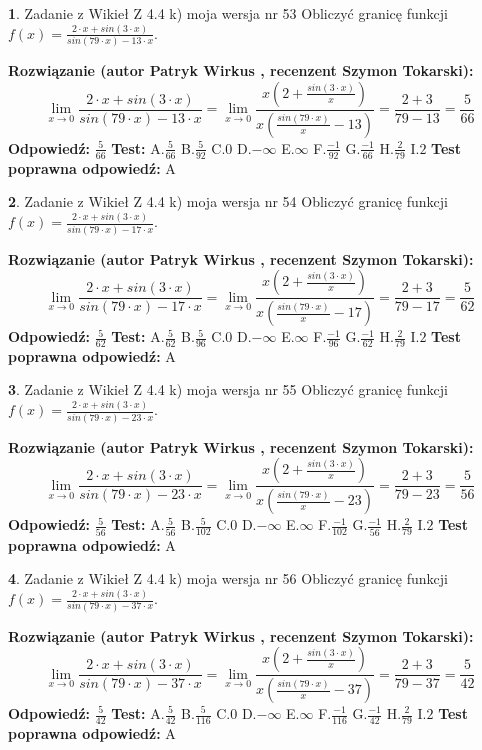 \documentclass[12pt, a4paper]{article}
\theoremstyle{definition} %
\newtheorem{zad}{}
\newcommand{\zadStart}[1]{\begin{zad}#1\newline}
\newcommand{\zadStop}{\end{zad}}
\newcommand{\rozwStart}[2]{\noindent \textbf{Rozwiązanie (autor #1 , recenzent #2): }\newline}
\newcommand{\rozwStop}{\newline}
\newcommand{\odpStart}{\noindent \textbf{Odpowiedź:}\newline}
\newcommand{\odpStop}{\newline}
\newcommand{\testStart}{\noindent \textbf{Test:}\newline}
\newcommand{\testStop}{\newline}
\newcommand{\kluczStart}{\noindent \textbf{Test poprawna odpowiedź:}\newline}
\newcommand{\kluczStop}{\newline}
\begin{document}
\zadStart{Zadanie z Wikieł Z 4.4 k) moja wersja nr 53}
Obliczyć granicę funkcji $f(x)=\frac{2\cdot x +sin(3\cdot x)}{sin(79\cdot x) -13\cdot x}$.
\zadStop
\rozwStart{Patryk Wirkus}{Szymon Tokarski}
$$\lim\limits_{x\to 0}\frac{2\cdot x +sin(3\cdot x)}{sin(79\cdot x) -13\cdot x}
=\lim\limits_{x\to 0}\frac{x(2+\frac{sin(3\cdot x)}{x})}{x(\frac{sin(79\cdot x)}{x}-13)}
=\frac{2+3}{79-13} = \frac{5}{66}$$
\rozwStop
\odpStart
$\frac{5}{66}$
\odpStop
\testStart
A.$\frac{5}{66}$
B.$\frac{5}{92}$
C.$0$
D.$-\infty$
E.$\infty$
F.$\frac{-1}{92}$
G.$\frac{-1}{66}$
H.$\frac{2}{79}$
I.$2$
\testStop
\kluczStart
A
\kluczStop



\zadStart{Zadanie z Wikieł Z 4.4 k) moja wersja nr 54}
Obliczyć granicę funkcji $f(x)=\frac{2\cdot x +sin(3\cdot x)}{sin(79\cdot x) -17\cdot x}$.
\zadStop
\rozwStart{Patryk Wirkus}{Szymon Tokarski}
$$\lim\limits_{x\to 0}\frac{2\cdot x +sin(3\cdot x)}{sin(79\cdot x) -17\cdot x}
=\lim\limits_{x\to 0}\frac{x(2+\frac{sin(3\cdot x)}{x})}{x(\frac{sin(79\cdot x)}{x}-17)}
=\frac{2+3}{79-17} = \frac{5}{62}$$
\rozwStop
\odpStart
$\frac{5}{62}$
\odpStop
\testStart
A.$\frac{5}{62}$
B.$\frac{5}{96}$
C.$0$
D.$-\infty$
E.$\infty$
F.$\frac{-1}{96}$
G.$\frac{-1}{62}$
H.$\frac{2}{79}$
I.$2$
\testStop
\kluczStart
A
\kluczStop



\zadStart{Zadanie z Wikieł Z 4.4 k) moja wersja nr 55}
Obliczyć granicę funkcji $f(x)=\frac{2\cdot x +sin(3\cdot x)}{sin(79\cdot x) -23\cdot x}$.
\zadStop
\rozwStart{Patryk Wirkus}{Szymon Tokarski}
$$\lim\limits_{x\to 0}\frac{2\cdot x +sin(3\cdot x)}{sin(79\cdot x) -23\cdot x}
=\lim\limits_{x\to 0}\frac{x(2+\frac{sin(3\cdot x)}{x})}{x(\frac{sin(79\cdot x)}{x}-23)}
=\frac{2+3}{79-23} = \frac{5}{56}$$
\rozwStop
\odpStart
$\frac{5}{56}$
\odpStop
\testStart
A.$\frac{5}{56}$
B.$\frac{5}{102}$
C.$0$
D.$-\infty$
E.$\infty$
F.$\frac{-1}{102}$
G.$\frac{-1}{56}$
H.$\frac{2}{79}$
I.$2$
\testStop
\kluczStart
A
\kluczStop



\zadStart{Zadanie z Wikieł Z 4.4 k) moja wersja nr 56}
Obliczyć granicę funkcji $f(x)=\frac{2\cdot x +sin(3\cdot x)}{sin(79\cdot x) -37\cdot x}$.
\zadStop
\rozwStart{Patryk Wirkus}{Szymon Tokarski}
$$\lim\limits_{x\to 0}\frac{2\cdot x +sin(3\cdot x)}{sin(79\cdot x) -37\cdot x}
=\lim\limits_{x\to 0}\frac{x(2+\frac{sin(3\cdot x)}{x})}{x(\frac{sin(79\cdot x)}{x}-37)}
=\frac{2+3}{79-37} = \frac{5}{42}$$
\rozwStop
\odpStart
$\frac{5}{42}$
\odpStop
\testStart
A.$\frac{5}{42}$
B.$\frac{5}{116}$
C.$0$
D.$-\infty$
E.$\infty$
F.$\frac{-1}{116}$
G.$\frac{-1}{42}$
H.$\frac{2}{79}$
I.$2$
\testStop
\kluczStart
A
\kluczStop
\end{document}
